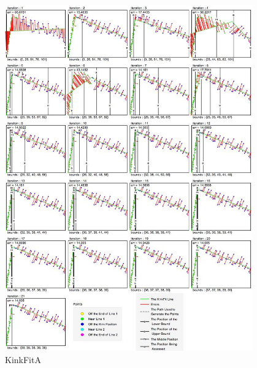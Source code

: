 \begin{figure}[h!]
  \centering
    \includegraphics[width=0.95\textwidth]{Chapter4/Figs/KinkFit_A.jpg}
    \caption{KinkFitA}\label{fig:KinkFitA}
\end{figure}

